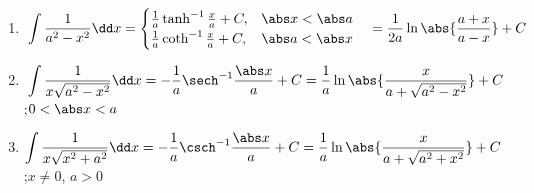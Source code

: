 \begin{minipage}[t]{.6\linewidth}
\begin{enumerate}
\item {$\intRuleStrut\ds\int\frac1{a^2-x^2}\dd x=\begin{cases}
\frac1a\tanh^{-1}\frac xa+C,&\abs x<\abs a\\
\frac1a\coth^{-1}\frac xa+C,&\abs a<\abs x
\end{cases}
\quad=\frac1{2a}\ln\abs{\frac{a+x}{a-x}}+C$}
\item $\intRuleStrut\ds\int\frac1{x\sqrt{a^2-x^2}}\dd x=-\frac1a\sech^{-1}\frac{\abs x}a+C=\frac1a\ln\abs{\frac x{a+\sqrt{a^2-x^2}}}+C$;\quad $0<\abs x<a$
\item $\ds\int\frac1{x\sqrt{x^2+a^2}}\dd x=-\frac1a\csch^{-1}\frac{\abs x}a+C=
\frac1a\ln\abs{\frac{x}{a+\sqrt{a^2+x^2}}}
+C$;\quad $x\ne0$, $a>0$
\end{enumerate}
\end{minipage}
\egroup


\clearpage

